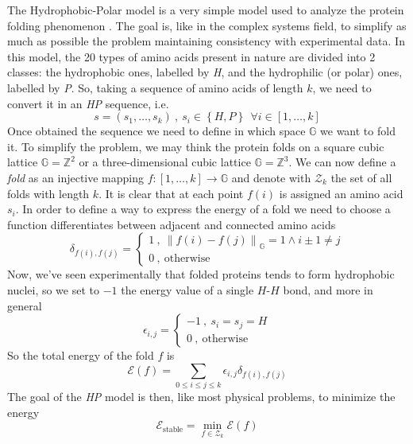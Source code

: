 The Hydrophobic-Polar model is a very simple model used to analyze the protein folding phenomenon \cite{PERM}.
The goal is, like in the complex systems field, to simplify as much as possible the problem maintaining consistency with experimental data.
In this model, the 20 types of amino acids present in nature are divided into 2 classes: the hydrophobic ones, labelled by \emph{H}, and the hydrophilic (or polar) ones, labelled by \emph{P}.
So, taking a sequence of amino acids of length $k$, we need to convert it in an \emph{HP} sequence, i.e.
\begin{equation*}
    s = \left(s_1, \ldots, s_k\right) \ , \ s_i \in \left\{H, P\right\} \ \ \forall i \in \left[1,\ldots,k\right]
\end{equation*}
Once obtained the sequence we need to define in which space $\mathbb{G}$ we want to fold it.
To simplify the problem, we may think the protein folds on a square cubic lattice $\mathbb{G} = \mathbb{Z}^2$ or a three-dimensional cubic lattice $\mathbb{G} = \mathbb{Z}^3$.
We can now define a \emph{fold} as an injective mapping $f : \left[1,\ldots,k\right] \to \mathbb{G}$ and denote with $\mathcal{Z}_k$ the set of all folds with length $k$.
It is clear that at each point $f(i)$ is assigned an amino acid $s_i$.
In order to define a way to express the energy of a fold we need to choose a function differentiates between adjacent and connected amino acids
\begin{equation*}
    \delta_{f(i),f(j)} =
    \begin{cases}
        1 \ , \ {\left\lVert f(i) - f(j) \right\rVert}_\mathbb{G} = 1 \land i \pm 1 \neq j\\
        0 \ , \ \text{otherwise}
    \end{cases}
\end{equation*}
Now, we've seen experimentally that folded proteins tends to form hydrophobic nuclei, so we set to $-1$ the energy value of a single $H$-$H$ bond, and more in general
\begin{equation*}
    \epsilon_{i,j} =
    \begin{cases}
        -1 \ , \ s_i = s_j = H\\
        0 \ , \ \text{otherwise}
    \end{cases}
\end{equation*}
So the total energy of the fold $f$ is
\begin{equation*}
    \mathcal{E}(f) = \sum_{0 \leq i \leq j \leq k} \epsilon_{i,j}\delta_{f(i),f(j)}
\end{equation*}
The goal of the \emph{HP} model is then, like most physical problems, to minimize the energy
\begin{equation*}
    \mathcal{E}_\text{stable} = \min_{f \in \mathcal{Z}_k} \mathcal{E}(f)
\end{equation*}
